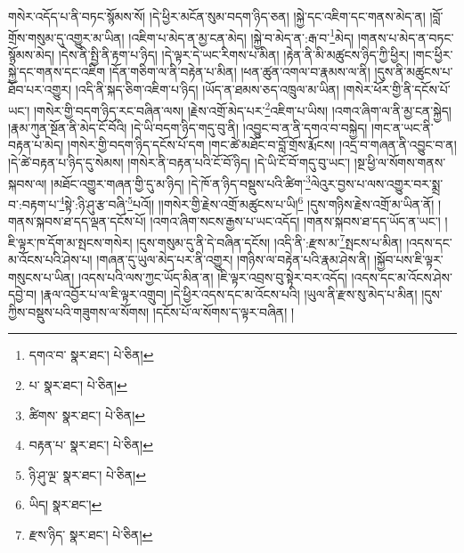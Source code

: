 གསེར་འདོད་པ་ནི་བཏང་སྙོམས་སོ། །དེ་ཕྱིར་མངོན་སུམ་བདག་ཉིད་ཅན། །སྐྱེ་དང་འཇིག་དང་གནས་མེད་ན། །བློ་གྲོས་གསུམ་དུ་འགྱུར་མ་ཡིན། །འཇིག་པ་མེད་ན་མྱ་ངན་མེད། །སྐྱེ་བ་མེད་ན་:རྒ་བ་\footnote{དགའ་བ་  སྣར་ཐང་།  པེ་ཅིན། }མེད། །གནས་པ་མེད་ན་བཏང་སྙོམས་མེད། །དེས་ནི་སྤྱི་ནི་རྟག་པ་ཉིད། །དེ་ལྟར་དེ་ཡང་རིགས་པ་མིན། །རྟེན་ནི་མི་མཚུངས་ཉིད་ཀྱི་ཕྱིར། །གང་ཕྱིར་སྐྱེ་དང་གནས་དང་འཇིག །དོན་གཅིག་ལ་ནི་བརྟེན་པ་མིན། །ཕན་ཚུན་འགལ་བ་རྣམས་ལ་ནི། །དུས་ནི་མཚུངས་པ་ཐོབ་པར་འགྱུར། །འདི་ནི་སྐད་ཅིག་འཇིག་པ་ཉིད། །ཡོད་ན་ཐམས་ཅད་འཁྲུལ་མ་ཡིན། །གསེར་ཕོར་གྱི་ནི་དངོས་པོ་ཡང་། །གསེར་གྱི་བདག་ཉིད་རང་བཞིན་ལས། །རྗེས་འགྲོ་མེད་པར་\footnote{པ་  སྣར་ཐང་།  པེ་ཅིན། }འཇིག་པ་ཡིས། །འགའ་ཞིག་ལ་ནི་མྱ་ངན་སྐྱེད། །རྣམ་ཀུན་སྔོན་ནི་མེད་ངོ་བོའི། །དེ་ཡི་བདག་ཉིད་གདུ་བུ་ནི། །འབྱུང་བ་ན་ནི་དགའ་བ་བསྐྱེད། །གང་ན་ཡང་ནི་བརྟན་པ་མེད། །གསེར་གྱི་བདག་ཉིད་དངོས་པོ་དག །གང་ཚེ་མཐོང་བ་བློ་གྲོས་རྨོངས། །འདྲ་བ་གཞན་ནི་འབྱུང་བ་ན། །དེ་ཚེ་བརྟན་པ་ཉིད་དུ་སེམས། །གསེར་ནི་བརྟན་པའི་ངོ་བོ་ཉིད། །དེ་ཡི་ངོ་བོ་གདུ་བུ་ཡང་། །སྔ་ཕྱི་ལ་སོགས་གནས་སྐབས་ལ། །མཐོང་འགྱུར་གཞན་གྱི་དུ་མ་ཉིད། །དེ་ཁོ་ན་ཉིད་བསྡུས་པའི་ཚིག་\footnote{ཚིགས་  སྣར་ཐང་།  པེ་ཅིན། }ལེའུར་བྱས་པ་ལས་འགྱུར་བར་སྨྲ་བ་:བརྟག་པ་\footnote{བརྟན་པ་  སྣར་ཐང་།  པེ་ཅིན། }སྟེ་:ཉི་ཤུ་རྩ་བཞི་\footnote{ཉི་ཤུ་ལྔ་  སྣར་ཐང་།  པེ་ཅིན། }པའོ།། །།གསེར་གྱི་རྗེས་འགྲོ་མཚུངས་པ་ཡི།\footnote{ཡིད།  སྣར་ཐང་། } །དུས་གཉིས་རྗེས་འགྲོ་མ་ཡིན་ནོ། །གནས་སྐབས་ཐ་དད་ལྡན་དངོས་པོ། །འགའ་ཞིག་སངས་རྒྱས་པ་ཡང་འདོད། །གནས་སྐབས་ཐ་དད་ཡོད་ན་ཡང་། །ཇི་ལྟར་ཁ་དོག་མ་སྤངས་གསེར། །དུས་གསུམ་དུ་ནི་དེ་བཞིན་དངོས། །འདི་ནི་:རྫས་མ་\footnote{རྫས་ཉིད་  སྣར་ཐང་།  པེ་ཅིན། }སྤངས་པ་མིན། །འདས་དང་མ་འོངས་པའི་ཤེས་པ། །གཞན་དུ་ཡུལ་མེད་པར་ནི་འགྱུར། །གཉིས་ལ་བརྟེན་པའི་རྣམ་ཤེས་ནི། །སྐྱོབ་པས་ཇི་ལྟར་གསུངས་པ་ཡིན། །འདས་པའི་ལས་ཀྱང་ཡོད་མིན་ན། །ཇི་ལྟར་འབྲས་བུ་སྟེར་བར་འདོད། །འདས་དང་མ་འོངས་ཤེས་དབྱེ་བ། །རྣལ་འབྱོར་པ་ལ་ཇི་ལྟར་འགྲུབ། །དེ་ཕྱིར་འདས་དང་མ་འོངས་པའི། །ཡུལ་ནི་རྫས་སུ་མེད་པ་མིན། །དུས་ཀྱིས་བསྡུས་པའི་གཟུགས་ལ་སོགས། །དངོས་པོ་ལ་སོགས་ད་ལྟར་བཞིན། །
